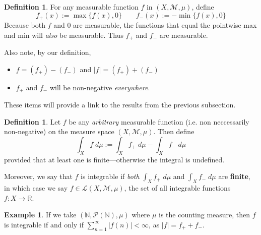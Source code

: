 \documentclass[12pt]{article}
\theoremstyle{plain}
\theoremstyle{definition}
\newtheorem{defn}[thm]{Definition}
\newtheorem{ex}[thm]{Example}
\theoremstyle{remark}
\begin{document}
\begin{defn}
For any measurable function $f$ in $(X,\mathscr{M},\mu)$, define
\[
    f_+(x) := \max\{f(x), 0\}
    \qquad
    f_-(x) := -\min\{f(x), 0\}
\]
Because both $f$ and $0$ are measurable, the functions that equal the pointwise max and min will \emph{also} be measurable. Thus $f_+$ and $f_-$ are measurable.

Also note, by our definition, 
\begin{itemize}
    \item $f = (f_+) - (f_-)$ and $|f| = (f_+) + (f_-)$
    \item $f_+$ and $f_-$ will be non-negative \emph{everywhere}.  
\end{itemize}
These items will provide a link to the results from the previous subsection.
\end{defn}

\begin{defn}
Let $f$ be any \emph{arbitrary} measurable function (i.e. non neccessarily non-negative) on the measure space $(X,\mathscr{M},\mu)$. Then define 
\[
    \int_X f\; d\mu := \int_X f_+ \; d\mu - \int_X f_- \; d\mu
\]
provided that at least one is finite---otherwise the integral is undefined.

Moreover, we say that $f$ is integrable if \emph{both} $\int_X f_+ \; d\mu$ and $\int_X f_- \; d\mu$ are \textbf{finite}, in which case we say $f\in\mathscr{L}(X,\mathscr{M},\mu)$, the set of all integrable functions $f:X\rightarrow\mathbb{R}$.
\end{defn}

\begin{ex}
    If we take $(\mathbb{N}, \mathscr{P}(\mathbb{N}), \mu)$ where $\mu$ is the counting measure, then $f$ is integrable if and only if $\sum^\infty_{n=1}|f(n)|<\infty$, as $|f| = f_+ + f_-$.
\end{ex}
\end{document}
